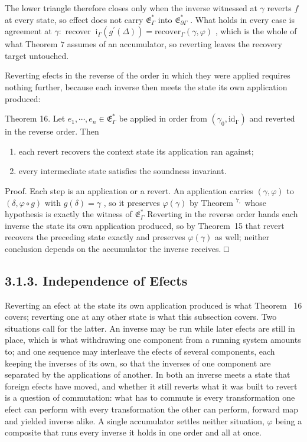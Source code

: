 \documentclass[
  10
]{article}
\begin{document}
The lower triangle therefore closes only when the inverse witnessed at
\(\gamma\) reverts \(f\) at every state, so effect does not carry
\({ \mathfrak { E } } _ { \Gamma } ^ { * }\) into
\({ \mathfrak { E } } _ { \partial \Gamma } ^ { * }\) . What holds in
every case is agreement at \(\gamma \colon\) recover
\(\mathrm { \ i } _ { \Gamma } ( g ^ { \prime } ( \Delta ) ) = \mathrm { r e c o v e r } _ { \Gamma } ( \gamma , \varphi )\)
, which is the whole of what Theorem \(7\) assumes of an accumulator, so
reverting leaves the recovery target untouched.

Reverting efects in the reverse of the order in which they were applied
requires nothing further, because each inverse then meets the state its
own application produced:

Theorem 16. Let
\(e _ { 1 } , \cdots , e _ { n } \in \mathfrak { E } _ { \Gamma } ^ { * }\)
be applied in order from
\(( \gamma _ { 0 } , \mathrm { i d _ { \Gamma } } )\) and reverted in
the reverse order. Then

\begin{enumerate}
\def\labelenumi{\arabic{enumi}.}
\item
  each revert recovers the context state its application ran against;
\item
  every intermediate state satisfies the soundness invariant.
\end{enumerate}

Proof. Each step is an application or a revert. An application carries
\(( \gamma , \varphi )\) to \(( \delta , \varphi \circ g )\) with
\(g ( \delta ) = \gamma\) , so it preserves \(\varphi ( \gamma )\) by
Theorem \(^ { 7 , }\) whose hypothesis is exactly the witness of
\({ \mathfrak { E } } _ { \Gamma } ^ { * }\) Reverting in the reverse
order hands each inverse the state its own application produced, so by
Theorem~15 that revert recovers the preceding state exactly and
preserves \(\varphi ( \gamma )\) as well; neither conclusion depends on
the accumulator the inverse receives. □

\subsection{3.1.3. Independence of Efects}\label{independence-of-efects}

Reverting an efect at the state its own application produced is what
Theorem~ 16 covers; reverting one at any other state is what this
subsection covers. Two situations call for the latter. An inverse may be
run while later efects are still in place, which is what withdrawing one
component from a running system amounts to; and one sequence may
interleave the efects of several components, each keeping the inverses
of its own, so that the inverses of one component are separated by the
applications of another. In both an inverse meets a state that foreign
efects have moved, and whether it still reverts what it was built to
revert is a question of commutation: what has to commute is every
transformation one efect can perform with every transformation the other
can perform, forward map and yielded inverse alike. A single accumulator
settles neither situation, \(\varphi\) being a composite that runs every
inverse it holds in one order and all at once.
\end{document}
